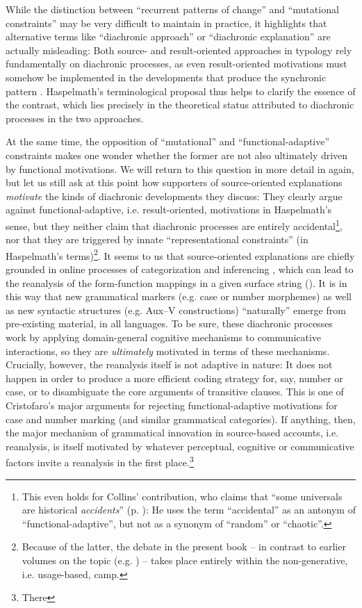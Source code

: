 \documentclass[output=paper]{langsci/langscibook}
\begin{document}
While the distinction between “recurrent patterns of change” and “mutational constraints” may be very difficult to maintain in practice, it highlights that alternative terms like “diachronic approach” or “diachronic explanation” are actually misleading: Both source- and result-oriented approaches in typology rely fundamentally on diachronic processes, as even result-oriented motivations must somehow be implemented in the developments that produce the synchronic pattern \citep{Haspelmath1999_Opt}. Haspelmath’s terminological proposal thus helps to clarify the essence of the contrast, which lies precisely in the theoretical status attributed to diachronic processes in the two approaches. 

At the same time, the opposition of “mutational” and “functional-adaptive” constraints makes one wonder whether the former are not also ultimately driven by functional motivations. We will return to this question in more detail in  again, but let us still ask at this point how supporters of source-oriented explanations \textit{motivate} the kinds of diachronic developments they discuss: They clearly argue against functional-adaptive, i.e. result-oriented, motivations in Haspelmath’s sense, but they neither claim that diachronic processes are entirely accidental\largerpage\footnote{This even holds for Collins’ contribution, who claims that “some universals are historical \textit{accidents}” (p. \pageref{p:collins:historicalaccidents}): He uses the term “accidental” as an antonym of “functional-adaptive”, but not as a synonym of “random” or “chaotic”.}, nor that they are triggered by innate “representational constraints” (in Haspelmath’s terms)\footnote{Because of the latter, the debate in the present book – in contrast to earlier volumes on the topic (e.g. \citealt{Hawkins1988_ExplEd,Good2008_Change}) – takes place entirely within the non-generative, i.e. usage-based, camp.}. It seems to us that source-oriented explanations are chiefly grounded in online processes of categorization and inferencing \citep{Bybee2010}, which can lead to the reanalysis of the form-function mappings in a given surface string (\citealt{Croft2000,DeSmet2009}). It is in this way that new grammatical markers (e.g. case or number morphemes) as well as new syntactic structures (e.g. Aux–V constructions) “naturally” emerge from pre-existing material, in all languages. To be sure, these diachronic processes work by applying domain-general cognitive mechanisms to communicative interactions, so they are \textit{ultimately} motivated in terms of these mechanisms. Crucially, however, the reanalysis itself is not adaptive in nature: It does not happen in order to produce a more efficient coding strategy for, say, number or case, or to disambiguate the core arguments of transitive clauses. This is one of Cristofaro’s major arguments for rejecting functional-adaptive motivations for case and number marking (and similar grammatical categories). If anything, then, the major mechanism of grammatical innovation in source-based accounts, i.e. reanalysis, is itself motivated by whatever perceptual, cognitive or communicative factors invite a reanalysis in the first place.\footnote{There 
}
\end{document}

